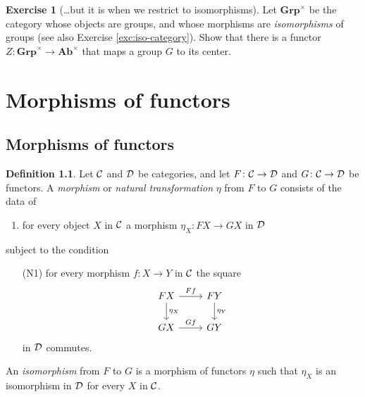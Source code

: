 \documentclass[11pt]{amsbook}
\def\Ab{\mathbf{Ab}}
\def\Grp{\mathbf{Grp}}
\theoremstyle{plain}
\theoremstyle{definition}
\newtheorem{definition}[theorem]{Definition}
\newtheorem{exercise}{Exercise}
\begin{document}
\begin{exercise}[\ldots but it is when we restrict to isomorphisms]
Let $\Grp^\times$ be the category whose objects are groups, and whose morphisms are \emph{isomorphisms} of groups (see also Exercise \ref{exc:iso-category}). Show that there is a functor $Z\colon \Grp^\times \to \Ab^\times$ that maps
a group $G$ to its center.
\end{exercise}
%




\chapter{Morphisms of functors}

\section{Morphisms of functors}


\begin{definition}
Let ${\mathcal{C}}$ and ${\mathcal{D}}$ be categories, and let $F\colon {\mathcal{C}}\to {\mathcal{D}}$ and $G\colon {\mathcal{C}} \to {\mathcal{D}}$ be functors. A \emph{morphism} or \emph{natural transformation} $\eta$ from $F$ to $G$ consists of the data of
\begin{enumerate}
\item for every object $X$ in ${\mathcal{C}}$ a morphism $\eta_X \colon FX \to GX$ in ${\mathcal{D}}$
\end{enumerate}
subject to the condition 
\begin{enumerate}
\item[(N1)]  for every morphism $f\colon X\to Y$ in ${\mathcal{C}}$ the square
\[
\begin{tikzcd}
FX \arrow{r}{Ff} \arrow{d}{\eta_X} & FY \arrow{d}{\eta_Y} \\
GX \arrow{r}{Gf} & GY
\end{tikzcd}
\]
in ${\mathcal{D}}$ commutes.
\end{enumerate}
An \emph{isomorphism} from $F$ to $G$ is a morphism of functors $\eta$ such that $\eta_X$ is an isomorphism in ${\mathcal{D}}$ for every $X$ in ${\mathcal{C}}$.
\end{definition}
\end{document}
